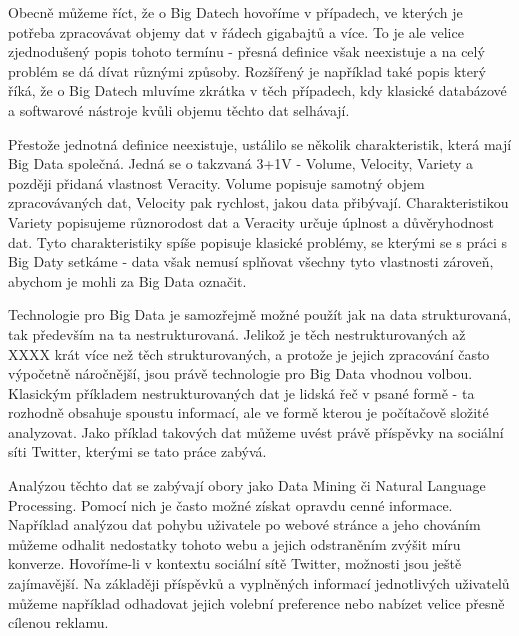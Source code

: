 \documentclass[thesis=B,czech]{FITthesis}[2012/06/26]
\begin{document}
	Obecně můžeme říct, že o Big Datech hovoříme v případech, ve kterých je potřeba zpracovávat objemy dat v řádech gigabajtů a více. To je ale velice zjednodušený popis tohoto termínu - přesná definice však neexistuje a na celý problém se dá dívat různými způsoby. Rozšířený je například také popis který říká, že o Big Datech mluvíme zkrátka v těch případech, kdy klasické databázové a softwarové nástroje kvůli objemu těchto dat selhávají\cite{http://www.webopedia.com/TERM/B/big_data.html}. 

	Přestože jednotná definice neexistuje, ustálilo se několik charakteristik, která mají Big Data společná. Jedná se o takzvaná 3+1V - Volume, Velocity, Variety a později přidaná vlastnost Veracity\cite{bakalarka Customer Intelligence v kontextu BigData}. Volume popisuje samotný objem zpracovávaných dat, Velocity pak rychlost, jakou data přibývají. Charakteristikou Variety popisujeme různorodost dat a Veracity určuje úplnost a důvěryhodnost dat. Tyto charakteristiky spíše popisuje klasické problémy, se kterými se s práci s Big Daty setkáme - data však nemusí splňovat všechny tyto vlastnosti zároveň, abychom je mohli za Big Data označit. 
	
 Technologie pro Big Data je samozřejmě možné použít jak na data strukturovaná, tak především na ta nestrukturovaná. Jelikož je těch nestrukturovaných až XXXX krát více než těch strukturovaných\cite{3}, a protože je jejich zpracování často výpočetně náročnější, jsou právě technologie pro Big Data vhodnou volbou. Klasickým příkladem nestrukturovaných dat je lidská řeč v psané formě - ta rozhodně obsahuje spoustu informací, ale ve formě kterou je počítačově složité analyzovat. Jako příklad takových dat můžeme uvést právě příspěvky na sociální síti Twitter, kterými se tato práce zabývá. 
 
 	Analýzou těchto dat se zabývají obory jako Data Mining či Natural Language Processing. Pomocí nich je často možné získat opravdu cenné informace. Například analýzou dat pohybu uživatele po webové stránce a jeho chováním můžeme odhalit nedostatky tohoto webu a jejich odstraněním zvýšit míru konverze. Hovoříme-li v kontextu sociální sítě Twitter, možnosti jsou ještě zajímavější. Na základěji příspěvků a vyplněných informací jednotlivých uživatelů můžeme například odhadovat jejich volební preference nebo nabízet velice přesně cílenou reklamu. 
	
\end{document}
